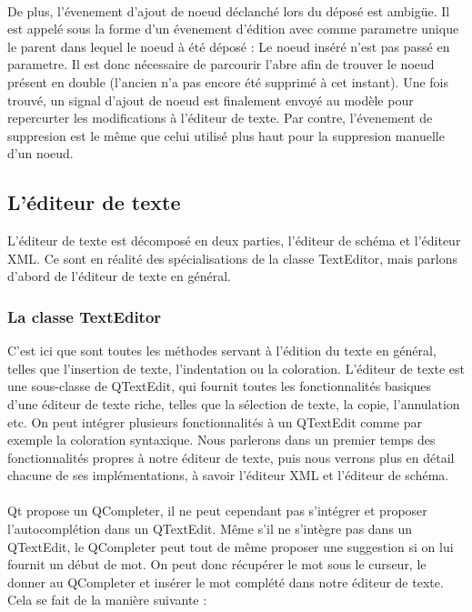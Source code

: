\paragraph{}
De plus, l'évenement d'ajout de noeud déclanché lors du déposé est ambigüe. Il est appelé sous la forme d'un évenement d'édition avec comme parametre unique le parent dans lequel le noeud à été déposé : Le noeud inséré n'est pas passé en parametre.
Il est donc nécessaire de parcourir l'abre afin de trouver le noeud présent en double (l'ancien n'a pas encore été supprimé à cet instant). Une fois trouvé, un signal d'ajout de noeud est finalement envoyé au modèle pour repercurter les modifications à l'éditeur de texte.
Par contre, l'évenement de suppresion est le même que celui utilisé plus haut pour la suppresion manuelle d'un noeud.


\subsection{L'éditeur de texte}

L'éditeur de texte est décomposé en deux parties, l'éditeur de schéma et l'éditeur XML. Ce sont en réalité des spécialisations de la classe TextEditor, mais parlons d'abord de l'éditeur de texte en général.
\subsubsection{La classe TextEditor}
C'est ici que sont toutes les méthodes servant à l'édition du texte en général, telles que l'insertion de texte, l'indentation ou la coloration. L'éditeur de texte est une sous-classe de QTextEdit, qui fournit toutes les fonctionnalités basiques d'une éditeur de texte riche, telles que la sélection de texte, la copie, l'annulation etc. On peut intégrer plusieurs fonctionnalités à un QTextEdit comme par exemple la coloration syntaxique. Nous parlerons dans un premier temps des fonctionnalités propres à notre éditeur de texte, puis nous verrons plus en détail chacune de ses implémentations, à savoir l'éditeur XML et l'éditeur de schéma.

\paragraph{}
Qt propose un QCompleter, il ne peut cependant pas s'intégrer et proposer l'autocomplétion dans un QTextEdit. Même s'il ne s'intègre pas dans un QTextEdit, le QCompleter peut tout de même proposer une suggestion si on lui fournit un début de mot. On peut donc récupérer le mot sous le curseur, le donner au QCompleter et insérer le mot complété dans notre éditeur de texte. Cela se fait de la manière suivante :

